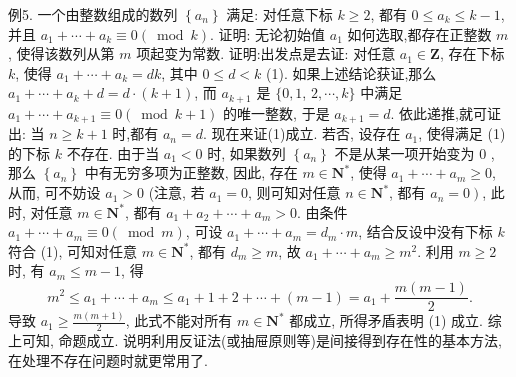 例5. 一个由整数组成的数列 $\left\{a_n\right\}$ 满足: 对任意下标 $k \geqslant 2$, 都有 $0 \leqslant a_k \leqslant k-1$, 并且 $a_1+\cdots+a_k \equiv 0(\bmod k)$. 证明: 无论初始值 $a_1$ 如何选取,都存在正整数 $m$, 使得该数列从第 $m$ 项起变为常数.
证明:出发点是去证: 对任意 $a_1 \in \mathbf{Z}$, 存在下标 $k$, 使得 $a_1+\cdots+a_k=d k$, 其中 $0 \leqslant d<k$ (1).
如果上述结论获证,那么 $a_1+\cdots+a_k+d=d \cdot(k+1)$, 而 $a_{k+1}$ 是 $\{0,1$, $2, \cdots, k\}$ 中满足 $a_1+\cdots+a_{k+1} \equiv 0(\bmod k+1)$ 的唯一整数, 于是 $a_{k+1}=d$. 依此递推,就可证出: 当 $n \geqslant k+1$ 时,都有 $a_n=d$.
现在来证(1)成立.
若否, 设存在 $a_1$, 使得满足 (1)的下标 $k$ 不存在.
由于当 $a_1<0$ 时, 如果数列 $\left\{a_n\right\}$ 不是从某一项开始变为 0 , 那么 $\left\{a_n\right\}$ 中有无穷多项为正整数, 因此, 存在 $m \in \mathbf{N}^*$, 使得 $a_1+\cdots+a_m \geqslant 0$, 从而, 可不妨设 $a_1>0$ (注意, 若 $a_1=0$, 则可知对任意 $n \in \mathbf{N}^*$, 都有 $\left.a_n=0\right)$, 此时, 对任意 $m \in \mathbf{N}^*$, 都有 $a_1+a_2+\cdots+a_m>0$.
由条件 $a_1+\cdots+a_m \equiv 0(\bmod m)$, 可设 $a_1+\cdots+a_m=d_m \cdot m$, 结合反设中没有下标 $k$ 符合 (1), 可知对任意 $m \in \mathbf{N}^*$, 都有 $d_m \geqslant m$, 故 $a_1+\cdots+a_m \geqslant m^2$. 利用 $m \geqslant 2$ 时, 有 $a_m \leqslant m-1$, 得
$$
m^2 \leqslant a_1+\cdots+a_m \leqslant a_1+1+2+\cdots+(m-1)=a_1+\frac{m(m-1)}{2} .
$$
导致 $a_1 \geqslant \frac{m(m+1)}{2}$, 此式不能对所有 $m \in \mathbf{N}^*$ 都成立, 所得矛盾表明 (1) 成立.
综上可知, 命题成立.
说明利用反证法(或抽屉原则等)是间接得到存在性的基本方法, 在处理不存在问题时就更常用了.



